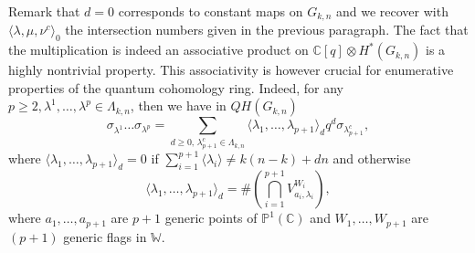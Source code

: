 \documentclass[10pt,11pt]{amsart}%
\begin{document}
Remark that $d=0$ corresponds to constant maps on $G_{k,n}$ and we recover with $\langle\lambda,\mu,\nu^c\rangle_0$ the intersection numbers given in the previous paragraph. The fact that the multiplication is indeed an associative product on $\mathbb{C}[q]\otimes H^*(G_{k,n})$ is a highly nontrivial property. This associativity is however crucial for enumerative properties of the quantum cohomology ring. Indeed, for any $p\geq 2, \lambda^{1},\ldots,\lambda^p\in \Lambda_{k,n}$, then we have in $QH(G_{k,n})$
\begin{equation}\label{eq:qring_combinatorics}\sigma_{\lambda^1}\dots \sigma_{\lambda^p}=\sum_{d\geq 0, \,\lambda_{p+1}^c\in \Lambda_{k,n}}\langle\lambda_1,\ldots,\lambda_{p+1}\rangle_dq^d\sigma_{\lambda_{p+1}^c},
\end{equation}
where $\langle\lambda_1,\ldots,\lambda_{p+1}\rangle_d=0$ if $\sum_{i=1}^{p+1}\langle \lambda_i\rangle\not=k(n-k)+dn$ and otherwise
$$\langle\lambda_1,\ldots,\lambda_{p+1}\rangle_d=\#\left(\bigcap_{i=1}^{p+1}V_{a_i,\lambda_i}^{W_i}\right),$$
where $a_1,\ldots,a_{p+1}$ are $p+1$ generic points of $\mathbb{P}^1(\mathbb{C})$ and $W_{1},\ldots,W_{p+1}$ are $(p+1)$ generic flags in $\mathbb{W}$. 
\end{document}
